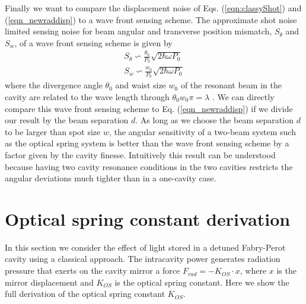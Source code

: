 Finally we want to compare the displacement noise of Eqs. (\ref{eqn:classyShot}) and (\ref{eqn_newraddisp}) to a wave front sensing scheme.
The approximate shot noise limited sensing noise for beam angular and transverse position mismatch, $S_\theta$ and $S_w$, of a wave front sensing scheme is given by
\begin{align}
\label{eqn:WFSShot}
S_\theta \backsim \frac{\theta_0}{P_0} \sqrt{2 \hbar \omega P_0} \\
S_w \backsim \frac{w_0}{P_0} \sqrt{2 \hbar \omega P_0}
\end{align}
where the divergence angle $\theta_0$ and waist size $w_0$ of the resonant beam in the cavity are related to the wave length through $\theta_0  w_0  \pi  = \lambda$ \cite{MavThesis}. We can directly compare this wave front sensing scheme to Eq. (\ref{eqn_newraddisp}) if we divide our result by the beam separation $d$.
As long as we choose the beam separation $d$ to be larger than spot size $w$,
 the angular sensitivity of a two-beam system such as the optical spring system
is better than the wave front sensing scheme 
by a factor given by the cavity finesse. Intuitively this result can be understood because having two cavity resonance conditions in the two cavities restricts the angular deviations much tighter than in a one-cavity case. 


\section{Optical spring constant derivation}
\label{app:A} 

In this section we consider the effect of light stored in a detuned Fabry-Perot cavity using a classical approach.
The intracavity power generates radiation pressure that exerts on the cavity mirror a force $F_{rad}=-K_{OS}\cdot x$,
where $x$ is the mirror displacement and $K_{OS}$ is the optical spring constant.
Here we show the full derivation of the optical spring constant $K_{OS}$.

